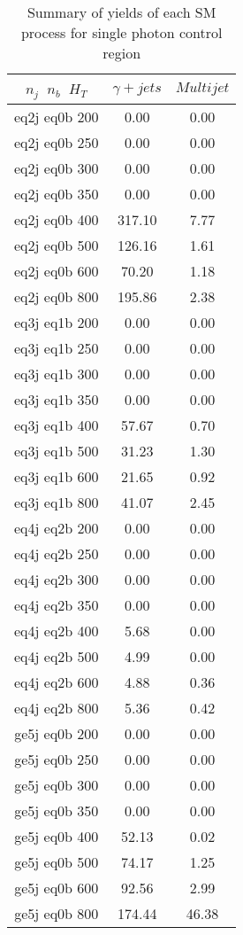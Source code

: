 

\begin{longtable}{| c | c | c  | }
\caption{Summary of yields of each SM process for single photon control region} \label{tab:yieldSM-singlephoton} \\    \hline 
$n_{j}$~$n_{b}$~$H_{T}$ & $\gamma+jets$ & $Multijet$\\ \hline 
eq2j eq0b 200 & 0.00 & 0.00\\ \hline 
eq2j eq0b 250 & 0.00 & 0.00\\ \hline 
eq2j eq0b 300 & 0.00 & 0.00\\ \hline 
eq2j eq0b 350 & 0.00 & 0.00\\ \hline 
eq2j eq0b 400 & 317.10 & 7.77\\ \hline 
eq2j eq0b 500 & 126.16 & 1.61\\ \hline 
eq2j eq0b 600 & 70.20 & 1.18\\ \hline 
eq2j eq0b 800 & 195.86 & 2.38\\ \hline 
eq3j eq1b 200 & 0.00 & 0.00\\ \hline 
eq3j eq1b 250 & 0.00 & 0.00\\ \hline 
eq3j eq1b 300 & 0.00 & 0.00\\ \hline 
eq3j eq1b 350 & 0.00 & 0.00\\ \hline 
eq3j eq1b 400 & 57.67 & 0.70\\ \hline 
eq3j eq1b 500 & 31.23 & 1.30\\ \hline 
eq3j eq1b 600 & 21.65 & 0.92\\ \hline 
eq3j eq1b 800 & 41.07 & 2.45\\ \hline 
eq4j eq2b 200 & 0.00 & 0.00\\ \hline 
eq4j eq2b 250 & 0.00 & 0.00\\ \hline 
eq4j eq2b 300 & 0.00 & 0.00\\ \hline 
eq4j eq2b 350 & 0.00 & 0.00\\ \hline 
eq4j eq2b 400 & 5.68 & 0.00\\ \hline 
eq4j eq2b 500 & 4.99 & 0.00\\ \hline 
eq4j eq2b 600 & 4.88 & 0.36\\ \hline 
eq4j eq2b 800 & 5.36 & 0.42\\ \hline 
ge5j eq0b 200 & 0.00 & 0.00\\ \hline 
ge5j eq0b 250 & 0.00 & 0.00\\ \hline 
ge5j eq0b 300 & 0.00 & 0.00\\ \hline 
ge5j eq0b 350 & 0.00 & 0.00\\ \hline 
ge5j eq0b 400 & 52.13 & 0.02\\ \hline 
ge5j eq0b 500 & 74.17 & 1.25\\ \hline 
ge5j eq0b 600 & 92.56 & 2.99\\ \hline 
ge5j eq0b 800 & 174.44 & 46.38\\ \hline 
    \hline 
    \hline 
\end{longtable}

